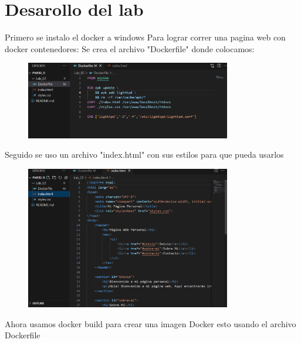 \documentclass{article}
\begin{document}
\section{Desarollo del lab}
Primero se instalo el docker a windows
Para lograr correr una pagina web con docker contenedores:
Se crea el archivo "Dockerfile" donde colocamos:
    \begin{figure}[H]
		          \centering
		          \includegraphics[width=0.8\textwidth,keepaspectratio]                       {img/Dockerfile_alpine.png}
    \end{figure}
Seguido se uso un archivo "index.html" con sus estilos para que pueda usarlos
    \begin{figure}[H]
		          \centering
		          \includegraphics[width=0.8\textwidth,keepaspectratio]                       {img/index_html.png}
    \end{figure}
Ahora usamos docker build para crear una imagen Docker esto usando el archivo Dockerfile
\end{document}
